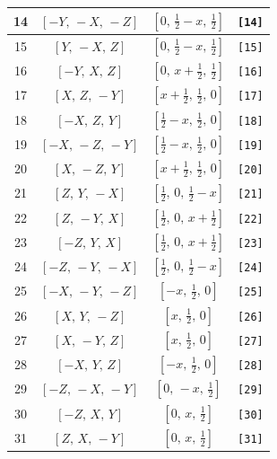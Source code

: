 \documentclass[fleqn,8pt]{jsarticle}
\begin{document}
\begin{longtable}{cccc}
14 & $\left[ - Y,\, - X,\, - Z \right]$ & $\left[ 0,\, \frac{1}{2} - x,\, \frac{1}{2} \right]$ & {\tt [14]} \\ \hline
15 & $\left[ Y,\, - X,\, Z \right]$ & $\left[ 0,\, \frac{1}{2} - x,\, \frac{1}{2} \right]$ & {\tt [15]} \\ \hline
16 & $\left[ - Y,\, X,\, Z \right]$ & $\left[ 0,\, x + \frac{1}{2},\, \frac{1}{2} \right]$ & {\tt [16]} \\ \hline
17 & $\left[ X,\, Z,\, - Y \right]$ & $\left[ x + \frac{1}{2},\, \frac{1}{2},\, 0 \right]$ & {\tt [17]} \\ \hline
18 & $\left[ - X,\, Z,\, Y \right]$ & $\left[ \frac{1}{2} - x,\, \frac{1}{2},\, 0 \right]$ & {\tt [18]} \\ \hline
19 & $\left[ - X,\, - Z,\, - Y \right]$ & $\left[ \frac{1}{2} - x,\, \frac{1}{2},\, 0 \right]$ & {\tt [19]} \\ \hline
20 & $\left[ X,\, - Z,\, Y \right]$ & $\left[ x + \frac{1}{2},\, \frac{1}{2},\, 0 \right]$ & {\tt [20]} \\ \hline
21 & $\left[ Z,\, Y,\, - X \right]$ & $\left[ \frac{1}{2},\, 0,\, \frac{1}{2} - x \right]$ & {\tt [21]} \\ \hline
22 & $\left[ Z,\, - Y,\, X \right]$ & $\left[ \frac{1}{2},\, 0,\, x + \frac{1}{2} \right]$ & {\tt [22]} \\ \hline
23 & $\left[ - Z,\, Y,\, X \right]$ & $\left[ \frac{1}{2},\, 0,\, x + \frac{1}{2} \right]$ & {\tt [23]} \\ \hline
24 & $\left[ - Z,\, - Y,\, - X \right]$ & $\left[ \frac{1}{2},\, 0,\, \frac{1}{2} - x \right]$ & {\tt [24]} \\ \hline
25 & $\left[ - X,\, - Y,\, - Z \right]$ & $\left[ - x,\, \frac{1}{2},\, 0 \right]$ & {\tt [25]} \\ \hline
26 & $\left[ X,\, Y,\, - Z \right]$ & $\left[ x,\, \frac{1}{2},\, 0 \right]$ & {\tt [26]} \\ \hline
27 & $\left[ X,\, - Y,\, Z \right]$ & $\left[ x,\, \frac{1}{2},\, 0 \right]$ & {\tt [27]} \\ \hline
28 & $\left[ - X,\, Y,\, Z \right]$ & $\left[ - x,\, \frac{1}{2},\, 0 \right]$ & {\tt [28]} \\ \hline
29 & $\left[ - Z,\, - X,\, - Y \right]$ & $\left[ 0,\, - x,\, \frac{1}{2} \right]$ & {\tt [29]} \\ \hline
30 & $\left[ - Z,\, X,\, Y \right]$ & $\left[ 0,\, x,\, \frac{1}{2} \right]$ & {\tt [30]} \\ \hline
31 & $\left[ Z,\, X,\, - Y \right]$ & $\left[ 0,\, x,\, \frac{1}{2} \right]$ & {\tt [31]} \\ \hline

\end{longtable}
\end{document}
